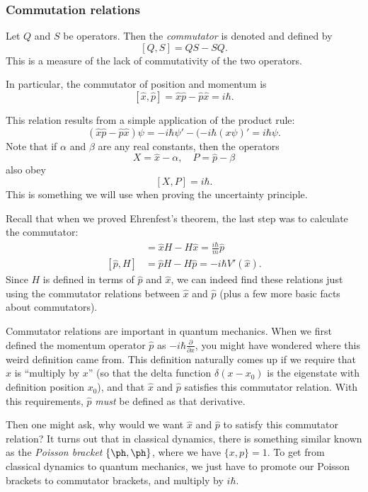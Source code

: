 \documentclass[a4paper]{article}
\begin{document}
\subsubsection*{Commutation relations}
\begin{defi}[Commutator]
  Let $Q$ and $S$ be operators. Then the \emph{commutator} is denoted and defined by
  \[
    [Q, S] = QS - SQ.
  \]
  This is a measure of the lack of commutativity of the two operators.

  In particular, the commutator of position and momentum is
  \[
    [\hat{x}, \hat{p}] = \hat{x}\hat{p} - \hat{p}\hat{x} = i\hbar.
  \]
\end{defi}
This relation results from a simple application of the product rule:
\[
  (\hat{x}\hat{p} - \hat{p}\hat{x}) \psi = -i\hbar \psi' - (-i\hbar(x \psi)' = i\hbar \psi.
\]
Note that if $\alpha$ and $\beta$ are any real constants, then the operators
\[
  X = \hat{x} - \alpha,\quad P = \hat{p} - \beta
\]
also obey
\[
  [X, P] = i\hbar.
\]
This is something we will use when proving the uncertainty principle.

Recall that when we proved Ehrenfest's theorem, the last step was to calculate the commutator:
\begin{align*}
  [\hat{x}, H] &= \hat{x}H - H\hat{x} = \frac{i\hbar}{m}\hat{p}\\
  [\hat{p}, H] &= \hat{p}H - H\hat{p} = -i\hbar V'(\hat{x}).
\end{align*}
Since $H$ is defined in terms of $\hat{p}$ and $\hat{x}$, we can indeed find these relations just using the commutator relations between $\hat{x}$ and $\hat{p}$ (plus a few more basic facts about commutators).

Commutator relations are important in quantum mechanics. When we first defined the momentum operator $\hat{p}$ as $-i\hbar \frac{\partial}{\partial x}$, you might have wondered where this weird definition came from. This definition naturally comes up if we require that $\hat{x}$ is ``multiply by $x$'' (so that the delta function $\delta(x - x_0)$ is the eigenstate with definition position $x_0$), and that $\hat{x}$ and $\hat{p}$ satisfies this commutator relation. With this requirements, $\hat{p}$ \emph{must} be defined as that derivative.

Then one might ask, why would we want $\hat{x}$ and $\hat{p}$ to satisfy this commutator relation? It turns out that in classical dynamics, there is something similar known as the \emph{Poisson bracket} $\{\ph, \ph\}$, where we have $\{x, p\} = 1$. To get from classical dynamics to quantum mechanics, we just have to promote our Poisson brackets to commutator brackets, and multiply by $i\hbar$.
\end{document}
